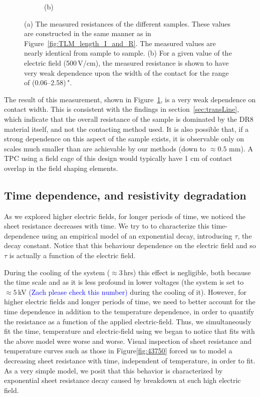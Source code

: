 \documentclass[a4paper,12pt]{article}
\newcommand{\DR}{DR8}
\newcommand{\RI}[1]{\textcolor{blue}{#1}}
\begin{document}
\begin{figure}[htb]
\begin{subfigure}[c]{0.32\textheight}
\begin{center}
		\vspace*{-\baselineskip} \hspace{2em} (b)
	\end{center}
\end{subfigure}
\caption{(a) The measured resistances of the different samples.  These values are constructed in the same manner as in Figure~\ref{fig:TLM_length_I_and_R}.  The measured values are nearly identical from sample to sample. (b) For a given value of the electric field (500\,V/cm), the measured resistance is shown to have very weak dependence upon the width of the contact for the range of (0.06--2.58)\,".} 
\label{fig:TLM_contact_contactRes}
\end{figure}

The result of this measurement, shown in Figure~\ref{fig:TLM_contact_contactRes}, is a very weak dependence on contact width.  This is consistent with the findings in section~\ref{sec:transLine}, which indicate that the overall resistance of the sample is dominated by the {\DR} material itself, and not the contacting method used.  It is also possible that, if a strong dependence on this aspect of the sample exists, it is observable only on scales much smaller than are achievable by our methods (down to $\approx 0.5$ mm).  A TPC using a field cage of this design would typically have 1 cm of contact overlap in the field shaping elements.


\subsection{Time dependence, and resistivity degradation}
\label{resdecayfit}


As we explored higher electric fields, for longer periods of time, we noticed the sheet resistance decreases with time. We try to to characterize this time-dependence using an empirical model of an exponential decay, introducing $\tau$, the decay constant. Notice that this behaviour dependence on the electric field and so $\tau$ is actually a function of the electric field.

During the cooling of the system ($\approx3$\,hrs) this effect is negligible, both because the time scale and as it is less profound in lower voltages (the system is set to $\approx5$\,kV \RI{(Zach please check this number)} during the cooling of it). However, for higher electric fields and longer periods of time, we need to better account for the time dependence in addition to the temperature dependence, in order to quantify the resistance as a function of the applied electric-field. Thus, we simultaneously fit the time, temperature and electric-field using
we began to notice that fits with the above model were worse and worse. Visual inspection of sheet resistance and temperature curves such as those in Figure\ref{fig:43750} forced us to model a decreasing sheet resistance with time, independent of temperature, in order to fit. As a very simple model, we posit that this behavior is characterized by exponential sheet resistance decay caused by breakdown at such high electric field. 
\end{document}
